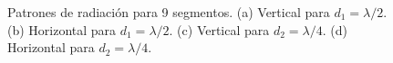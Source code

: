 \documentclass[11pt]{report}
\begin{document}
\begin{figure}[h!]
	\caption{Patrones de radiación para 9 segmentos.
		(a) Vertical para $d_1 =\lambda/2$.
		(b) Horizontal para $d_1=\lambda/2$.
		(c) Vertical para $d_2=\lambda/4$.
		(d) Horizontal para $d_2=\lambda/4$.}
\end{figure}
\end{document}
